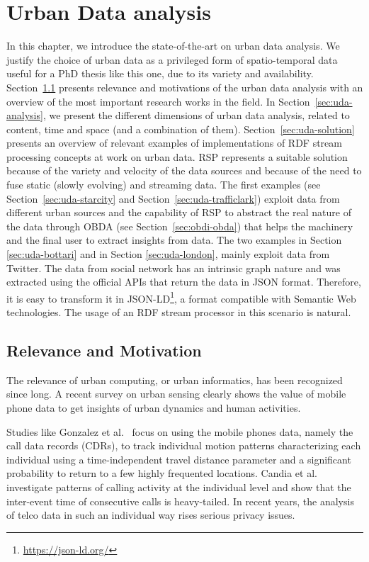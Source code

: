 \chapter{Urban Data analysis}\label{ch:uda}

In this chapter, we introduce the state-of-the-art on urban data analysis.
We justify the choice of urban data as a privileged form of spatio-temporal data useful for a PhD thesis like this one, due to its variety and availability.
Section~\ref{sec:uda-motivation} presents relevance and motivations of the urban data analysis with an overview of the most important research works in the field.
In Section~\ref{sec:uda-analysis}, we present the different dimensions of urban data analysis, related to content, time and space (and a combination of them).
Section~\ref{sec:uda-solution} presents an overview of relevant examples of implementations of RDF stream processing concepts at work on urban data.
RSP represents a suitable solution because of the variety and velocity of the data sources and because of the need to fuse static (slowly evolving) and streaming data.
The first examples (see Section~\ref{sec:uda-starcity} and Section~\ref{sec:uda-trafficlark}) exploit data from different urban sources and the capability of RSP to abstract the real nature of the data through OBDA (see Section~\ref{sec:obdi-obda}) that helps the machinery and the final user to extract insights from data.
The two examples in Section \ref{sec:uda-bottari} and in Section \ref{sec:uda-london}, mainly exploit data from Twitter. The data from social network has an intrinsic graph nature and was extracted using the official APIs that return the data in JSON format. Therefore, it is easy to transform it in JSON-LD\footnote{\url{https://json-ld.org/}}, a format compatible with Semantic Web technologies. The usage of an RDF stream processor in this scenario is natural.

\section{Relevance and Motivation}\label{sec:uda-motivation}
The relevance of urban computing, or urban informatics, has been recognized since long. A recent survey on urban sensing \cite{DBLP:journals/csur/CalabreseFB14} clearly shows the value of mobile phone data to get insights of urban dynamics and human activities. 

Studies like Gonzalez et al.~\cite{gonzalez2008understanding} focus on using the mobile phones data, namely the call data records (CDRs), to track individual motion patterns characterizing each individual using a time-independent travel distance parameter and a significant probability to return to a few highly frequented locations. Candia et al.~\cite{candia2008uncovering} investigate patterns of calling activity at the individual level and show that the inter-event time of consecutive calls is heavy-tailed. 
In recent years, the analysis of telco data in such an individual way rises serious privacy issues.

